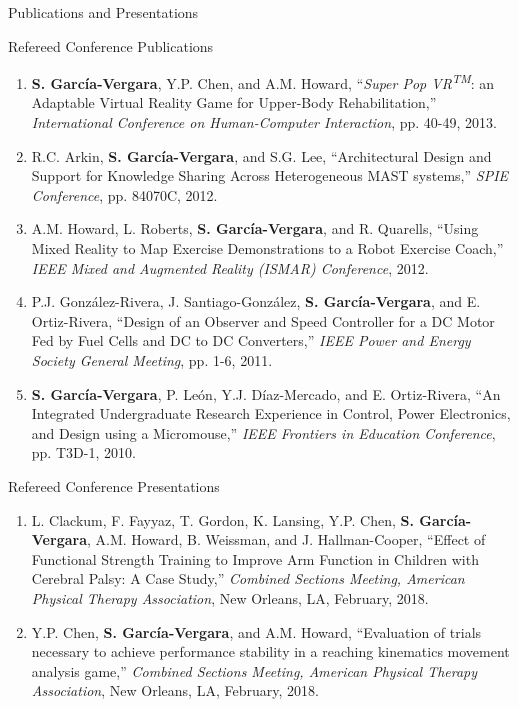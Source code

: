 \documentclass{resume} %
\newcommand{\Sergio}{\textbf{S. Garc\'{i}a-Vergara}}
\newcommand{\SuperPop}{Super Pop VR\textsuperscript{TM}\space}
\begin{document}
\begin{rSection}{Publications and Presentations}
\begin{rSubsection}{Refereed Conference Publications}{}{}{}
\begin{enumerate}
\item \Sergio, Y.P. Chen, and A.M. Howard, ``\textit{\SuperPop}: an Adaptable
  Virtual Reality Game for Upper-Body Rehabilitation,'' \textit{International
    Conference on Human-Computer Interaction}, pp. 40-49, 2013.

\item R.C. Arkin, \Sergio, and S.G. Lee, ``Architectural Design and Support for
  Knowledge Sharing Across Heterogeneous MAST systems,'' \textit{SPIE
    Conference}, pp. 84070C, 2012.

\item A.M. Howard, L. Roberts, \Sergio, and R. Quarells, ``Using Mixed Reality
  to Map Exercise Demonstrations to a Robot Exercise Coach,'' \textit{IEEE Mixed
    and Augmented Reality (ISMAR) Conference}, 2012.

\item P.J. Gonz\'{a}lez-Rivera, J. Santiago-Gonz\'{a}lez, \Sergio, and
  E. Ortiz-Rivera, ``Design of an Observer and Speed Controller for a DC Motor
  Fed by Fuel Cells and DC to DC Converters,'' \textit{IEEE Power and Energy
    Society General Meeting}, pp. 1-6, 2011.

\item \Sergio, P. Le\'{o}n, Y.J. D\'{i}az-Mercado, and E. Ortiz-Rivera, ``An
  Integrated Undergraduate Research Experience in Control, Power Electronics,
  and Design using a Micromouse,'' \textit{IEEE Frontiers in Education
    Conference}, pp. T3D-1, 2010.


\end{enumerate}
\end{rSubsection}





\begin{rSubsection}{Refereed Conference Presentations}{}{}{}
\item
\begin{enumerate}

\item L. Clackum, F. Fayyaz, T. Gordon, K. Lansing, Y.P. Chen, \Sergio,
  A.M. Howard, B. Weissman, and J. Hallman-Cooper, ``Effect of Functional
  Strength Training to Improve Arm Function in Children with Cerebral Palsy: A
  Case Study,'' \textit{Combined Sections Meeting, American Physical Therapy
    Association}, New Orleans, LA, February, 2018.

\item Y.P. Chen, \Sergio, and A.M. Howard, ``Evaluation of trials necessary to
  achieve performance stability in a reaching kinematics movement analysis
  game,'' \textit{Combined Sections Meeting, American Physical Therapy
    Association}, New Orleans, LA, February, 2018.


\end{enumerate}
\end{rSubsection}
\end{rSection}
\end{document}
